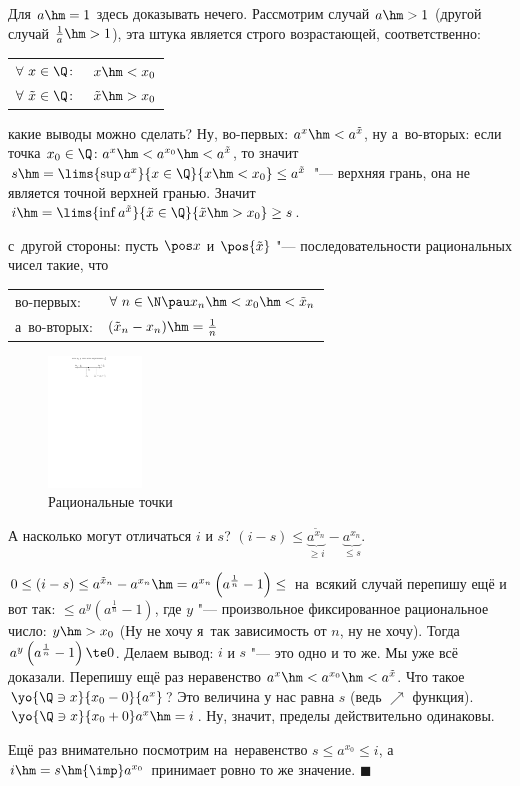 \documentclass[a4paper,10pt,twoside]{article}
\newenvironment{Proof}
       {\par\noindent{\textbf{Доказательство.}}}
       {\hfill$\scriptstyle\blacksquare$}
\begin{document}
\begin{Proof}
    Для $a\hm=1$ здесь доказывать нечего. Рассмотрим случай $a\hm>1$ (другой случай $\frac1a\hm>1$), эта штука является строго возрастающей, соответственно:

    \begin{tabular}{ll}
    $\forall\  x\in\Q\colon$&$x\hm<x_0$\\
    $\forall\  \tilde x\in\Q\colon$&$\tilde x\hm>x_0$
    \end{tabular} какие выводы можно сделать? Ну, во-первых: $a^x\hm<a^{\tilde x}$, ну а~во-вторых: если точка $x_0\in\Q\colon a^x\hm<a^{x_0}\hm<a^{\tilde x}$, то значит
    $s\hm=\lims{\sup a^x}{x\in\Q}{x\hm<x_0}\leq a^{\tilde x}$ "--- верхняя грань, она не является точной верхней гранью. Значит
    $i\hm=\lims{\inf a^{\tilde x}}{\tilde x\in\Q}{\tilde x\hm>x_0}\geq s$.

    с~другой стороны: пусть $\pos x$ и $\pos{\tilde x}$ "--- последовательности рациональных чисел такие, что

    \begin{tabular}{ll}
        во-первых:&$\forall\  n\in\N\pau x_n\hm<x_0\hm<{\tilde x}_n$\\
        а~во-вторых:&$({\tilde x}_n-x_n)\hm=\frac1n$
    \end{tabular}

    \begin{figure}[htbp]\centering
    \includegraphics[height=3.5cm]{img/final/galat/vvedf/pokaz.pdf}\caption{Рациональные точки}
\end{figure}

А насколько могут отличаться $i$ и $s$? $(i-s)\leq \underbrace{a^{{\tilde x}_n}}_{\geq i}-\underbrace{a^{x_n}}_{\leq s}$.

$0\leq(i-s)\leq a^{{\tilde x}_n}-a^{x_n}\hm=a^{x_n}\left(a^{\frac1n}-1\right)\leq$ на~всякий случай перепишу ещё и вот так: $\leq
a^y\left(a^{\frac1n}-1\right)$, где $y$ "--- произвольное фиксированное рациональное число: $y\hm>x_0$ (Ну не хочу я~так зависимость от $n$, ну не хочу).
Тогда $a^y\left(a^{\frac1n}-1\right)\te0$. Делаем вывод: $i$ и $s$ "--- это одно и то же. Мы уже всё доказали. Перепишу ещё раз неравенство
$a^x\hm<a^{x_0}\hm<a^{\tilde x}$. Что такое $\yo{\Q\ni x}{x_0-0}{a^x}$? Это величина у нас равна $s$ (ведь $\nearrow$ функция).
$\yo{\Q\ni x}{x_0+0}a^x\hm=i$. Ну, значит, пределы действительно одинаковы.

Ещё раз внимательно посмотрим на~неравенство $s\leq a^{x_0}\leq i$, а~$i\hm=s\hm{\imp} a^{x_0}$ принимает ровно то же значение.
\end{Proof}
\end{document}

